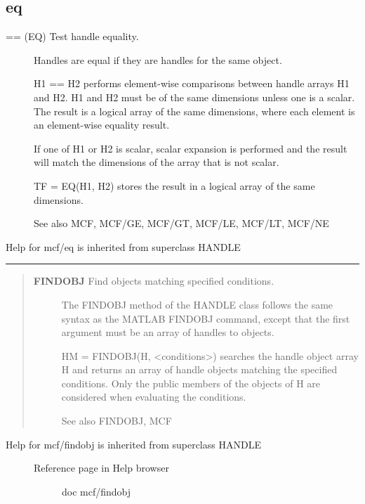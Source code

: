 \documentclass[letterpaper,10pt,english]{sphinxmanual}
\begin{document}
\subsection{eq}
\label{classes/utils/@mcf/mcf:eq}\label{classes/utils/@mcf/mcf:id1}\begin{description}
\item[{== (EQ)   Test handle equality.}] \leavevmode
Handles are equal if they are handles for the same object.

H1 == H2 performs element-wise comparisons between handle arrays H1 and
H2.  H1 and H2 must be of the same dimensions unless one is a scalar.
The result is a logical array of the same dimensions, where each
element is an element-wise equality result.

If one of H1 or H2 is scalar, scalar expansion is performed and the
result will match the dimensions of the array that is not scalar.

TF = EQ(H1, H2) stores the result in a logical array of the same
dimensions.

See also MCF, MCF/GE, MCF/GT, MCF/LE, MCF/LT, MCF/NE

\end{description}

Help for mcf/eq is inherited from superclass HANDLE


\bigskip\hrule{}\bigskip

\label{classes/utils/@mcf/mcf:findobj}\begin{quote}
\begin{description}
\item[{\textbf{FINDOBJ}   Find objects matching specified conditions.}] \leavevmode
The FINDOBJ method of the HANDLE class follows the same syntax as the
MATLAB FINDOBJ command, except that the first argument must be an array
of handles to objects.

HM = FINDOBJ(H, \textless{}conditions\textgreater{}) searches the handle object array H and
returns an array of handle objects matching the specified conditions.
Only the public members of the objects of H are considered when
evaluating the conditions.

See also FINDOBJ, MCF

\end{description}
\end{quote}
\begin{description}
\item[{Help for mcf/findobj is inherited from superclass HANDLE}] \leavevmode\begin{description}
\item[{Reference page in Help browser}] \leavevmode
doc mcf/findobj

\end{description}

\end{description}
\end{document}
